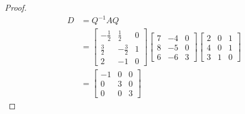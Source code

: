 \documentclass[11pt]{scrartcl}
\begin{document}
\begin{enumerate}[label=\alph*.]
{\begin{proof}
\begin{align*}
			      D & = Q^{-1} A Q                \\
			        & =\begin{bmatrix}-\frac{1}{2}&\frac{1}{2}&0\\ \frac{3}{2}&-\frac{3}{2}&1\\ 2&-1&0\end{bmatrix}
			      \begin{bmatrix}
				      7 & -4 & 0 \\ 8 & -5 & 0 \\ 6 & -6 & 3
			      \end{bmatrix}
			      \begin{bmatrix}
				      2 & 0 & 1 \\
				      4 & 0 & 1 \\
				      3 & 1 & 0
			      \end{bmatrix}      \\
			        & =
			      \begin{bmatrix}
				      -1 & 0 & 0 \\ 0&3&0\\ 0&0&3
			      \end{bmatrix}
		      \end{align*}


\end{proof}}
\end{enumerate}
\end{document}
